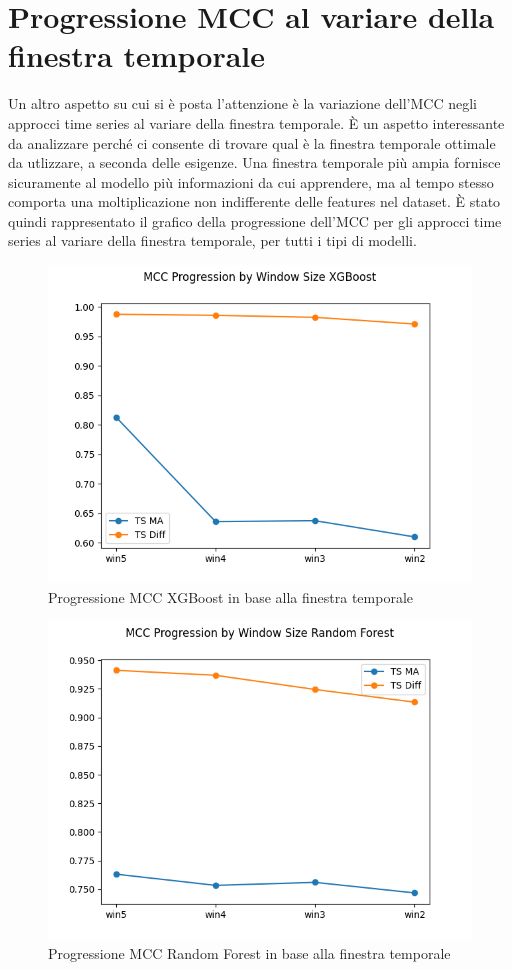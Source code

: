 \section{Progressione MCC al variare della finestra temporale}
Un altro aspetto su cui si \`e posta l'attenzione \`e la variazione dell'MCC negli approcci time series al variare della finestra temporale. \`E un aspetto interessante da analizzare perch\'e ci consente di trovare qual \`e la finestra temporale ottimale da utlizzare, a seconda delle esigenze. Una finestra temporale pi\`u ampia fornisce sicuramente al modello pi\`u informazioni da cui apprendere, ma al tempo stesso comporta una moltiplicazione non indifferente delle features nel dataset. \`E stato quindi rappresentato il grafico della progressione dell'MCC per gli approcci time series al variare della finestra temporale, per tutti i tipi di modelli.

\begin{figure}[H]
    \centering
    \includegraphics[width=0.78\linewidth]{MCC_Progression_by_Window_Size_XGBoost.png}
    \caption{Progressione MCC XGBoost in base alla finestra temporale}
    \label{fig:enter-label}
\end{figure}

\begin{figure}[H]
    \centering
    \includegraphics[width=0.78\linewidth]{MCC_Progression_by_Window_Size_Random Forest.png}
    \caption{Progressione MCC Random Forest in base alla finestra temporale}
    \label{fig:enter-label}
\end{figure}

